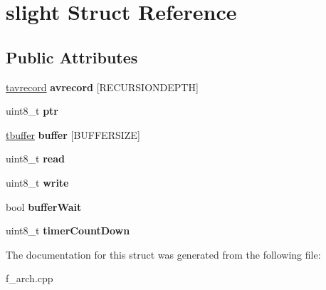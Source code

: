 \hypertarget{structslight}{}\section{slight Struct Reference}
\label{structslight}
\subsection*{Public Attributes}
\begin{DoxyCompactItemize}
\item 
\mbox{\label{structslight_ab7bdb6049c6ea6f70a57058d047ca004}} 
\mbox{\hyperlink{structsavrecord}{tavrecord}} {\bfseries avrecord} \mbox{[}R\+E\+C\+U\+R\+S\+I\+O\+N\+D\+E\+P\+TH\mbox{]}
\item 
\mbox{\label{structslight_ae284e9ce1bbb3b6897345ad05eb5d761}} 
uint8\+\_\+t {\bfseries ptr}
\item 
\mbox{\label{structslight_ac02318b234d25b6b1b9b015fce10338f}} 
\mbox{\hyperlink{structsbuffer}{tbuffer}} {\bfseries buffer} \mbox{[}B\+U\+F\+F\+E\+R\+S\+I\+ZE\mbox{]}
\item 
\mbox{\label{structslight_abf721def09ab39665f4d4cc30cb016dc}} 
uint8\+\_\+t {\bfseries read}
\item 
\mbox{\label{structslight_a2b845a89b85de1db390194760a1b8d37}} 
uint8\+\_\+t {\bfseries write}
\item 
\mbox{\label{structslight_a9f72dfa211f0791f5661d87603d216fb}} 
bool {\bfseries buffer\+Wait}
\item 
\mbox{\label{structslight_a19b101e51a920f34a3b180caab0df565}} 
uint8\+\_\+t {\bfseries timer\+Count\+Down}
\end{DoxyCompactItemize}


The documentation for this struct was generated from the following file\+:\begin{DoxyCompactItemize}
\item 
f\+\_\+arch.\+cpp\end{DoxyCompactItemize}
